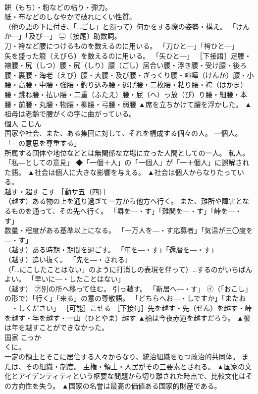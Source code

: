 \documentclass[8pt]{extreport}
\begin{document}
\begin{CJK}{UTF8}{min}
\\	餅（もち）・粉などの粘り・弾力。 
\\	紙・布などのしなやかで破れにくい性質。 
\\	（他の語の下に付き、「…ごし」と濁って）何かをする際の姿勢・構え。 「けんか―」「及び―」 ㊁〔接尾〕助数詞。 
\\	刀・袴など腰につけるものを数えるのに用いる。 「刀ひと―」「袴ひと―」 
\\	矢を盛った箙（えびら）を数えるのに用いる。 「矢ひと―」 ［下接語］足腰・襟腰・尻（しつ）腰・尻（しり）腰（ごし）居合い腰・浮き腰・受け腰・後ろ腰・裏腰・海老（えび）腰・大腰・及び腰・ぎっくり腰・喧嘩（けんか）腰・小腰・高腰・中腰・強腰・釣り込み腰・逃げ腰・二枚腰・粘り腰・袴（はかま）腰・跳ね腰・払い腰・二重（ふたえ）腰・屁（へ）っ放（ぴ）り腰・細腰・本腰・前腰・丸腰・物腰・柳腰・弓腰・弱腰	▲席を立ちかけて腰を浮かした。 ▲祖母は老齢で腰がくの字に曲がっている。
\\	個人	こじん	
\\	国家や社会、また、ある集団に対して、それを構成する個々の人。 一個人。 「―の意思を尊重する」 
\\	所属する団体や地位などとは無関係な立場に立った人間としての一人。 私人。 「私―としての意見」 ◆「一個＋人」の「一個人」が「一＋個人」に誤解された語。	▲社会は個人に大きな影響を与える。 ▲社会は個人からなりたっている。
\\	越す・超す	こす	［動サ五（四）］ 
\\	（越す）ある物の上を通り過ぎて一方から他方へ行く。 また、難所や障害となるものを通って、その先へ行く。 「塀を―・す」「難関を―・す」「峠を―・す」 
\\	数量・程度がある基準以上になる。 「一万人を―・す応募者」「気温が三〇度を―・す」 
\\	（越す）ある時期・期間を過ごす。 「年を―・す」「還暦を―・す」 
\\	（越す）追い抜く。 「先を―・される」 
\\	（「…にこしたことはない」のように打消しの表現を伴って）…するのがいちばんよい。 「早いに―・したことはない」 
\\	（越す） ㋐別の所へ移って住む。 引っ越す。 「新居へ―・す」 ㋑（「おこし」の形で）「行く」「来る」の意の尊敬語。 「どちらへお―・しですか」「またお―・しください」 ［可能］こせる ［下接句］先を越す・先（せん）を越す・峠を越す・年を越す・一山（ひとやま）越す	▲船は今夜赤道を越すだろう。 ▲彼は年を越すことができなかった。
\\	国家	こっか	
\\	くに。 
\\	一定の領土とそこに居住する人々からなり、統治組織をもつ政治的共同体。 または、その組織・制度。 主権・領土・人民がその三要素とされる。	▲国家の文化とアイデンティティという枢要な問題から切り離された時点で、比較文化はその方向性を失う。 ▲国家の名誉は最高の価値ある国家的財産である。

\end{CJK}
\end{document}
